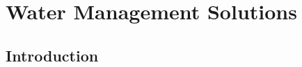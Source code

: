 \chapter{Water Management Solutions}
\label{chap:watermgmt}

\lipsum[1-2]
\section{Introduction}\label{sec:watermgmt:intro}
\lipsum[2-4]